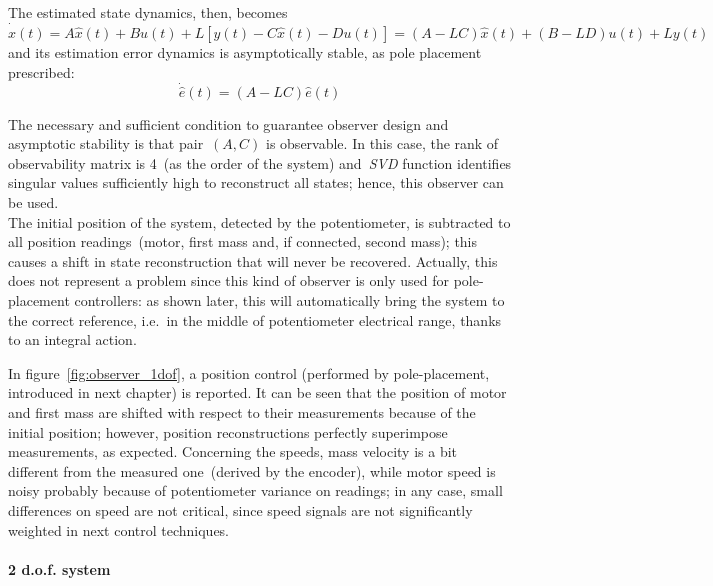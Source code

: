 The estimated state dynamics, then, becomes
\begin{equation}
	\dot{\hat{x}}(t) = A\hat{x}(t) + Bu(t) + L [y(t) - C\hat{x}(t) - Du(t)] = (A-LC)\hat{x}(t) + (B-LD)u(t) + Ly(t)
\end{equation}
and its estimation error dynamics is asymptotically stable, as pole placement prescribed:
\begin{equation}
	\dot{\hat{e}} (t) = (A-LC) \hat{e} (t)
\end{equation}

The necessary and sufficient condition to guarantee observer design and asymptotic stability is that pair~$(A,C)$ is observable. In this case, the rank of observability matrix is 4~(as the order of the system) and~\textit{SVD} function identifies singular values sufficiently high to reconstruct all states; hence, this observer can be used. \\

The initial position of the system, detected by the potentiometer, is subtracted to all position readings~(motor, first mass and, if connected, second mass); this causes a shift in state reconstruction that will never be recovered. Actually, this does not represent a problem since this kind of observer is only used for pole-placement controllers: as shown later, this will automatically bring the system to the correct reference, i.e.\ in the middle of potentiometer electrical range, thanks to an integral action.

In figure~\ref{fig:observer_1dof}, a position control (performed by pole-placement, introduced in next chapter) is reported. It can be seen that the position of motor and first mass are shifted with respect to their measurements because of the initial position; however, position reconstructions perfectly superimpose measurements, as expected. Concerning the speeds, mass velocity is a bit different from the measured one~(derived by the encoder), while motor speed is noisy probably because of potentiometer variance on readings; in any case, small differences on speed are not critical, since speed signals are not significantly weighted in next control techniques.

\paragraph{2 d.o.f. system}

